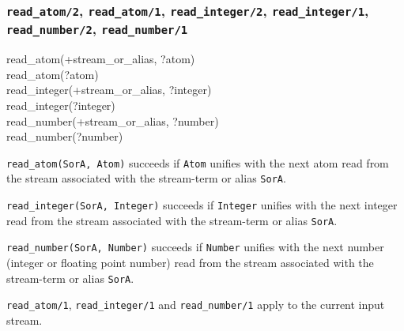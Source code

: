 \subsubsection{\texttt{read\_atom/2},
               \texttt{read\_atom/1}, 
               \texttt{read\_integer/2},
               \texttt{read\_integer/1}, \\ 
               \texttt{read\_number/2},
               \texttt{read\_number/1}}
\label{read-atom/2}

\begin{TemplatesOneCol}
read\_atom(+stream\_or\_alias, ?atom)\\
read\_atom(?atom)\\
read\_integer(+stream\_or\_alias, ?integer)\\
read\_integer(?integer)\\
read\_number(+stream\_or\_alias, ?number)\\
read\_number(?number)

\end{TemplatesOneCol}

\Description

\texttt{read\_atom(SorA, Atom)} succeeds if \texttt{Atom}
unifies with the next atom read from the stream associated with the
stream-term or alias \texttt{SorA}.

\texttt{read\_integer(SorA, Integer)} succeeds if
\texttt{Integer} unifies with the next integer read from the stream
associated with the stream-term or alias \texttt{SorA}.

\texttt{read\_number(SorA, Number)} succeeds if
\texttt{Number} unifies with the next number (integer or floating point
number) read from the stream associated with the stream-term or alias
\texttt{SorA}.

\texttt{read\_atom/1}, \texttt{read\_integer/1} and \texttt{read\_number/1}
apply to the current input stream.

